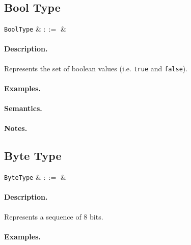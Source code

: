 
\subsection{Bool Type}

\begin{syntax}
 \verb+BoolType+ & $::=$ &  \\
\end{syntax}

\paragraph{Description.} Represents the set of boolean values (i.e. \lstinline{true} and \lstinline{false}).

\paragraph{Examples.}

\paragraph{Semantics.}

\paragraph{Notes.} 


\subsection{Byte Type}

\begin{syntax}
 \verb+ByteType+ & $::=$ &  \\
\end{syntax}

\paragraph{Description.}  Represents a sequence of 8 bits. 
\paragraph{Examples.}

